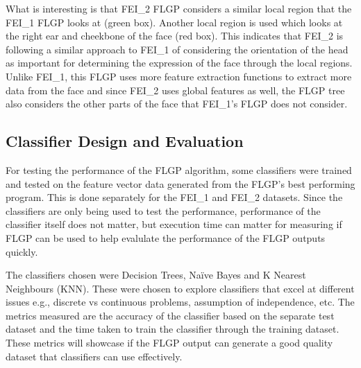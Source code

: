 \documentclass{article}
\begin{document}
\noindent What is interesting is that FEI\_2 FLGP considers a similar local region that the FEI\_1 FLGP looks at (green box). Another local region is used which looks at the right ear and cheekbone of the face (red box). This indicates that FEI\_2 is following a similar approach to FEI\_1 of considering the orientation of the head as important for determining the expression of the face through the local regions. Unlike FEI\_1, this FLGP uses more feature extraction functions to extract more data from the face and since FEI\_2 uses global features as well, the FLGP tree also considers the other parts of the face that FEI\_1's FLGP does not consider. \par
\subsection*{Classifier Design and Evaluation}
For testing the performance of the FLGP algorithm, some classifiers were trained and tested on the feature vector data generated from the FLGP's best performing program. This is done separately for the FEI\_1 and FEI\_2 datasets. Since the classifiers are only being used to test the performance, performance of the classifier itself does not matter, but execution time can matter for measuring if FLGP can be used to help evalulate the performance of the FLGP outputs quickly. \par
\noindent The classifiers chosen were Decision Trees, Naïve Bayes and K Nearest Neighbours (KNN). These were chosen to explore classifiers that excel at different issues e.g., discrete vs continuous problems, assumption of independence, etc. The metrics measured are the accuracy of the classifier based on the separate test dataset and the time taken to train the classifier through the training dataset. These metrics will showcase if the FLGP output can generate a good quality dataset that classifiers can use effectively.  \par
\end{document}
